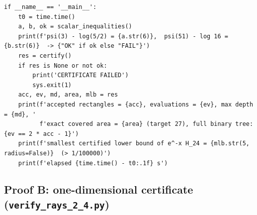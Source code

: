 \documentclass[11pt,a4paper]{article}
\theoremstyle{plain}
\theoremstyle{remark}
\begin{document}
\begin{lstlisting}
if __name__ == '__main__':
    t0 = time.time()
    a, b, ok = scalar_inequalities()
    print(f'psi(3) - log(5/2) = {a.str(6)},  psi(51) - log 16 = {b.str(6)}  -> {"OK" if ok else "FAIL"}')
    res = certify()
    if res is None or not ok:
        print('CERTIFICATE FAILED')
        sys.exit(1)
    acc, ev, md, area, mlb = res
    print(f'accepted rectangles = {acc}, evaluations = {ev}, max depth = {md}, '
          f'exact covered area = {area} (target 27), full binary tree: {ev == 2 * acc - 1}')
    print(f'smallest certified lower bound of e^-x H_24 = {mlb.str(5, radius=False)}  (> 1/100000)')
    print(f'elapsed {time.time() - t0:.1f} s')
\end{lstlisting}
\subsection{Proof B: one-dimensional certificate (\texttt{verify\_rays\_2\_4.py})}\label{app:B}
\end{document}

